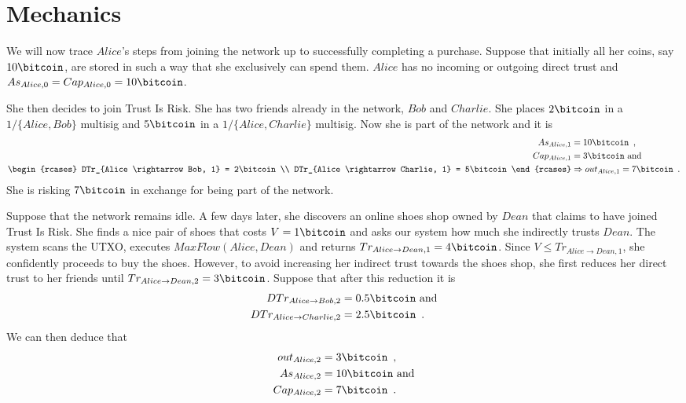 \section{Mechanics}
  We will now trace $Alice$'s steps from joining the network up to successfully completing a purchase. Suppose that initially
  all her coins, say $10\bitcoin$, are stored in such a way that she exclusively can spend them. $Alice$ has no incoming or
  outgoing direct trust and $As_{Alice, 0} = Cap_{Alice, 0} = 10\bitcoin$.

  She then decides to join Trust Is Risk. She has two friends already in the network, $Bob$ and $Charlie$. She places
  $2\bitcoin$ in a $1/\{Alice, Bob\}$ multisig and $5\bitcoin$ in a $1/\{Alice, Charlie\}$ multisig. Now she is part of the
  network and it is
  \begin{align*}
    As_{Alice, 1} &= 10\bitcoin \enspace, \\
    Cap_{Alice, 1} &= 3\bitcoin \mbox{ and} \\
    \begin{rcases}
      DTr_{Alice \rightarrow Bob, 1} = 2\bitcoin \\
      DTr_{Alice \rightarrow Charlie, 1} = 5\bitcoin
    \end{rcases}
    &\Rightarrow out_{Alice, 1} = 7\bitcoin \enspace.
  \end{align*}
  She is risking $7\bitcoin$ in exchange for being part of the network.

  Suppose that the network remains idle. A few days later, she discovers an online shoes shop owned by $Dean$ that claims to
  have joined Trust Is Risk. She finds a nice pair of shoes that costs $V = 1\bitcoin$ and asks our system how much she
  indirectly trusts $Dean$. The system scans the UTXO, executes $MaxFlow(Alice, Dean)$ and returns
  $Tr_{Alice \rightarrow Dean, 1} = 4\bitcoin$. Since $V \leq Tr_{Alice \rightarrow Dean, 1}$, she confidently proceeds to
  buy the shoes. However, to avoid increasing her indirect trust towards the shoes shop, she first reduces her direct trust
  to her friends until $Tr_{Alice \rightarrow Dean, 2} = 3\bitcoin$. Suppose that after this reduction it is
  \begin{align*}
    DTr_{Alice \rightarrow Bob, 2} &= 0.5\bitcoin \mbox{ and} \\
    DTr_{Alice \rightarrow Charlie, 2} &= 2.5\bitcoin \enspace.
  \end{align*}
  We can then deduce that
  \begin{align*}
    out_{Alice, 2} &= 3\bitcoin \enspace, \\
    As_{Alice, 2} &= 10\bitcoin \mbox{ and} \\
    Cap_{Alice, 2} &= 7\bitcoin \enspace.
  \end{align*}

